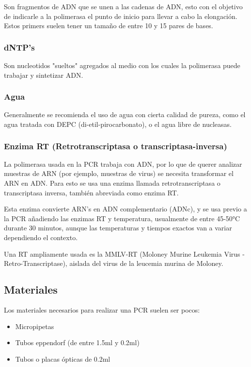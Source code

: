 Son fragmentos de ADN que se unen a las cadenas de ADN, esto con el objetivo de indicarle a la polimerasa el punto de inicio para llevar a cabo la elongación.
Estos primers suelen tener un tamaño de entre 10 y 15 pares de bases.

\subsubsection{dNTP's}

Son nucleotidos "sueltos" agregados al medio con los cuales la polimerasa puede trabajar y sintetizar ADN.

\subsubsection{Agua}

Generalmente se recomienda el uso de agua con cierta calidad de pureza, como el agua tratada con DEPC (di-etil-pirocarbonato), o el agua libre de nucleasas.

\subsubsection{Enzima RT (Retrotranscriptasa o transcriptasa-inversa)}

La polimerasa usada en la PCR trabaja con ADN, por lo que de querer analizar muestras de ARN (por ejemplo, muestras de virus) se necesita transformar el ARN en ADN. Para esto se usa una enzima llamada retrotranscriptasa o transcriptasa inversa, también abreviada como enzima RT.

Esta enzima convierte ARN's en ADN complementario (ADNc), y se usa previo a la PCR añadiendo las enzimas RT y temperatura, usualmente de entre 45-50°C durante 30 minutos, aunque las temperaturas y tiempos exactos van a variar dependiendo el contexto.

Una RT ampliamente usada es la MMLV-RT (Moloney Murine Leukemia Virus - Retro-Transcriptase), aislada del virus de la leucemia murina de Moloney.

\subsection{Materiales}

Los materiales necesarios para realizar una PCR suelen ser pocos:

\begin{itemize}
    \item Micropipetas
    \item Tubos eppendorf (de entre 1.5ml y 0.2ml)
    \item Tubos o placas ópticas de 0.2ml
\end{itemize}

